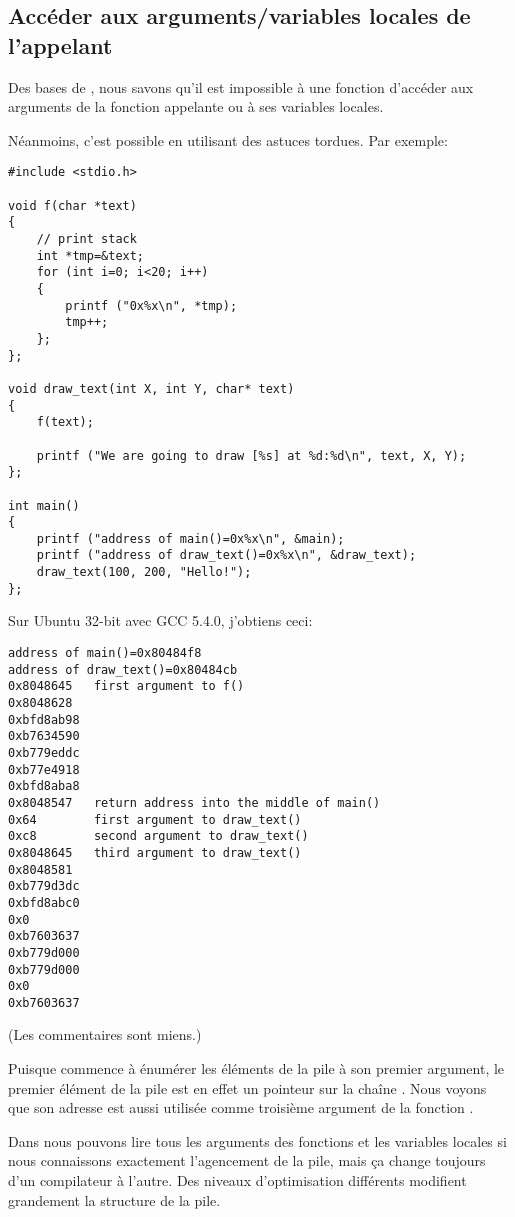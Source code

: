 \subsection{Accéder aux arguments/variables locales de l'appelant}

Des bases de \CCpp, nous savons qu'il est impossible à une fonction d'accéder aux
arguments de la fonction appelante ou à ses variables locales.

Néanmoins, c'est possible en utilisant des astuces tordues.
Par exemple:

\begin{lstlisting}[style=customc]
#include <stdio.h>

void f(char *text)
{
	// print stack
	int *tmp=&text;
	for (int i=0; i<20; i++)
	{
		printf ("0x%x\n", *tmp);
		tmp++;
	};
};

void draw_text(int X, int Y, char* text)
{
	f(text);

	printf ("We are going to draw [%s] at %d:%d\n", text, X, Y);
};

int main()
{
	printf ("address of main()=0x%x\n", &main);
	printf ("address of draw_text()=0x%x\n", &draw_text);
	draw_text(100, 200, "Hello!");
};
\end{lstlisting}

Sur Ubuntu 32-bit avec GCC 5.4.0, j'obtiens ceci:

\begin{lstlisting}
address of main()=0x80484f8
address of draw_text()=0x80484cb
0x8048645	first argument to f()
0x8048628
0xbfd8ab98
0xb7634590
0xb779eddc
0xb77e4918
0xbfd8aba8
0x8048547	return address into the middle of main()
0x64		first argument to draw_text()
0xc8		second argument to draw_text()
0x8048645	third argument to draw_text()
0x8048581
0xb779d3dc
0xbfd8abc0
0x0
0xb7603637
0xb779d000
0xb779d000
0x0
0xb7603637
\end{lstlisting}

(Les commentaires sont miens.)

Puisque  commence à énumérer les éléments de la pile à son premier argument,
le premier élément de la pile est en effet un pointeur sur la chaîne .
Nous voyons que son adresse est aussi utilisée comme troisième argument de la fonction
.

Dans  nous pouvons lire tous les arguments des fonctions et les variables
locales si nous connaissons exactement l'agencement de la pile, mais ça change toujours
d'un compilateur à l'autre.
Des niveaux d'optimisation différents modifient grandement la structure de la pile.

